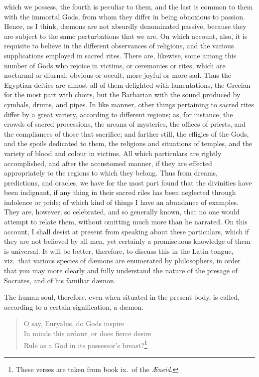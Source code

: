 \documentclass[twoside]{article}
\begin{document}
which we possess, the fourth is peculiar to them, and the last is common to
them with the immortal Gods, from whom they differ in being obnoxious to
passion. Hence, as I think, d{\ae}mons are not absurdly denominated passive,
because they are subject to the same perturbations that we are. On which
account, also, it is requisite to believe in the different observances of
religions, and the various supplications employed in sacred rites. There are,
likewise, some among this number of Gods who rejoice in victims, or ceremonies
or rites, which are nocturnal or diurnal, obvious or occult, more joyful or
more sad. Thus the Egyptian deities are almost all of them delighted with
lamentations, the Grecian for the most part with choirs, but the Barbarian with
the sound produced by cymbals, drums, and pipes. In like manner, other things
pertaining to sacred rites differ by a great variety, according to different
regions; as, for instance, the crowds of sacred processions, the arcana of
mysteries, the offices of priests, and the compliances of those that sacrifice;
and farther still, the effigies of the Gods, and the spoils dedicated to them,
the religions and situations of temples, and the variety of blood and colour in
victims. All which particulars are rightly accomplished, and after the
accustomed manner, if they are effected appropriately to the regions to which
they belong. Thus from dreams, predictions, and oracles, we have for the most
part found that the divinities have been indignant, if any thing in their
sacred riles has been neglected through indolence or pride; of which kind of
things I have an abundance of examples. They are, however, so celebrated, and
so generally known, that no one would attempt to relate them, without omitting
much more than he narrated.  On this account, I shall desist at present from
speaking about these particulars, which if they are not believed by all men,
yet certainly a promiscuous knowledge of them is universal. It will be better,
therefore, to discuss this in the Latin tongue, viz.~that various species of
d{\ae}mons are enumerated by philosophers, in order that you may more clearly
and fully understand the nature of the presage of Socrates, and of his familiar
d{\ae}mon.

The human soul, therefore, even when situated in the present body, is called,
according to a certain signification, a d{\ae}mon.

\begin{verse} O say, Euryalus, do Gods inspire\\ In minds this ardour, or does
fierce desire\\ Rule as a God in its possessor's breast?\footnote{These verses
are taken from book ix.~of the \textit{{\AE}neid}.} \end{verse}
\end{document}
